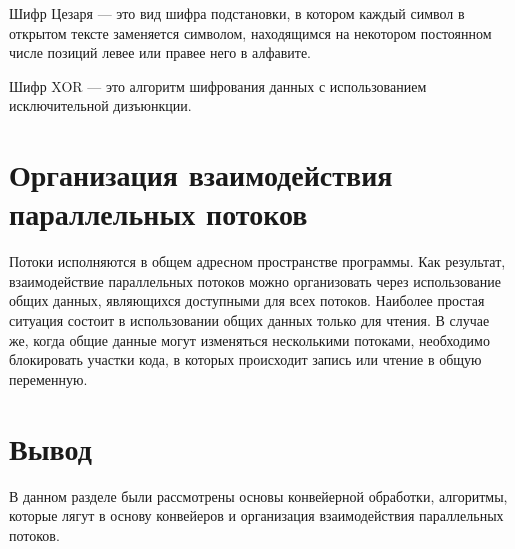 Шифр Цезаря --- это вид шифра подстановки, в котором каждый символ в открытом тексте заменяется символом, находящимся на некотором постоянном числе позиций левее или правее него в алфавите.

Шифр XOR --- это алгоритм шифрования данных с использованием исключительной дизъюнкции.

\section{Организация взаимодействия параллельных потоков}
Потоки исполняются в общем адресном пространстве программы. Как результат, взаимодействие параллельных потоков можно организовать через использование общих данных, являющихся доступными для всех потоков. Наиболее простая ситуация состоит в использовании общих данных только для чтения. В случае же, когда общие данные могут изменяться несколькими потоками, необходимо блокировать участки кода, в которых происходит запись или чтение в общую переменную. 
\section*{Вывод}
В данном разделе были рассмотрены основы конвейерной обработки, алгоритмы, которые лягут в основу конвейеров и
организация взаимодействия параллельных потоков.